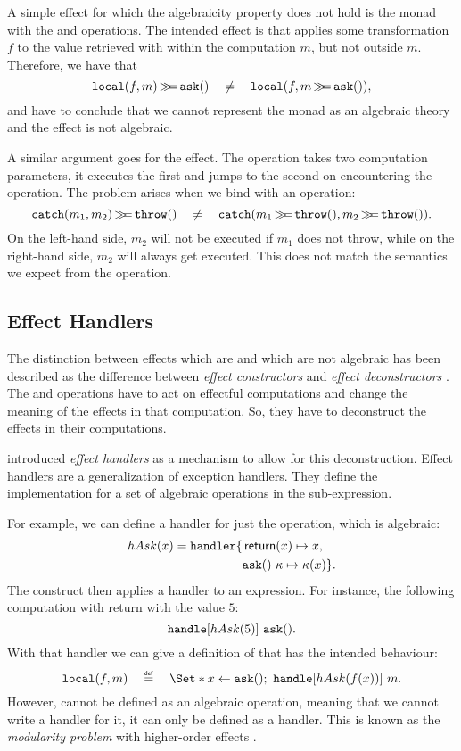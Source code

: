 A simple effect for which the algebraicity property does not hold is the  monad with the \olocal and \oask operations. The intended effect is that \olocal applies some transformation $f$ to the value retrieved with \oask within the computation $m$, but not outside $m$. Therefore, we have that
\[
    \mathtt{local}(f, m) \operatorname{\mathtt{\gg\!\!=}} \mathtt{ask}() \quad\neq\quad \mathtt{local}(f, m \operatorname{\mathtt{\gg\!\!=}} \mathtt{ask}()),
\]
and have to conclude that we cannot represent the  monad as an algebraic theory and the effect is not algebraic.

A similar argument goes for the  effect. The \ocatch operation takes two computation parameters, it executes the first and jumps to the second on encountering the \othrow operation. The problem arises when we bind with an \othrow operation:
\[
    \mathtt{catch}(m_1, m_2) \operatorname{\mathtt{\gg\!\!=}} \mathtt{throw}() \quad\neq\quad \mathtt{catch}(m_1\operatorname{\mathtt{\gg\!\!=}}\mathtt{throw}(), m_2\operatorname{\mathtt{\gg\!\!=}}\mathtt{throw}()).
\]
On the left-hand side, $m_2$ will not be executed if $m_1$ does not throw, while on the right-hand side, $m_2$ will always get executed. This does not match the semantics we expect from the \ocatch operation.

\subsection{Effect Handlers}

The distinction between effects which are and which are not algebraic has been described as the difference between \emph{effect constructors} and \emph{effect deconstructors} \autocite{plotkin_algebraic_2003}. The \olocal and \ocatch operations have to act on effectful computations and change the meaning of the effects in that computation. So, they have to deconstruct the effects in their computations.

\textcite{castagna_handlers_2009} introduced \emph{effect handlers} as a mechanism to allow for this deconstruction. Effect handlers are a generalization of exception handlers. They define the implementation for a set of algebraic operations in the sub-expression.

For example, we can define a handler for just the \oask operation, which is algebraic:
\[
    hAsk(x) = \text{\texttt{handler}} \{
        \begin{aligned}[t]
            &\operatorname{\mathsf{return}}(x) \mapsto x, \\
            &\mathtt{ask}()\ \kappa \mapsto \kappa(x) \}.\\
        \end{aligned}
\]
The \handle construct then applies a handler to an expression. For instance, the following computation with return with the value $5$:
\[
    \text{\texttt{handle}}[hAsk(5)]\ \mathtt{ask}().
\]
With that handler we can give a definition of \olocal that has the intended behaviour:
\[
    \olocal(f, m) \quad\defeq\quad \S{x \gets \oask()\seq \handle[hAsk(f(x))]\ m}.
\]
However, \olocal cannot be defined as an algebraic operation, meaning that we cannot write a handler for it, it can only be defined as a handler. This is known as the \emph{modularity problem} with higher-order effects \autocite{wu_effect_2014}.

